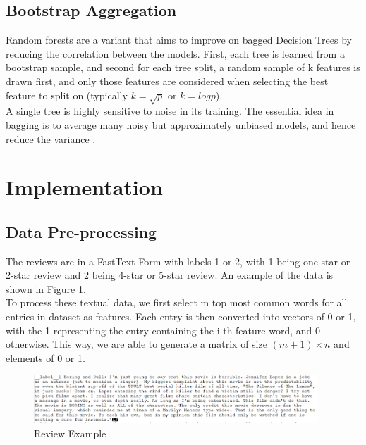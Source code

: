 \documentclass[11pt]{article}
\begin{document}
\subsection{Bootstrap Aggregation}
Random forests are a variant that aims to improve on bagged Decision Trees by reducing the correlation between the models. First, each tree is learned from a bootstrap sample, and second for each tree split, a random sample of k features is drawn first, and only those features are considered when selecting the best feature to split on (typically $k=\sqrt{p}$ or $k=log p$).\\

 A single tree is highly sensitive to noise in its training. The essential idea in bagging is to average many noisy but approximately unbiased models, and hence reduce the variance \cite{rf2}.\\

\section{Implementation}
\subsection{Data Pre-processing}
The reviews are in a FastText Form with labels 1 or 2, with 1 being one-star or 2-star review and 2 being 4-star or 5-star review. An example of the data is shown in Figure \ref{reviewExample}.\\

To process these textual data, we first select m top most common words for all entries in dataset as features. Each entry is then converted into vectors of 0 or 1, with the 1 representing the entry containing the i-th feature word, and 0 otherwise. This way, we are able to generate a matrix of size $(m+1) \times n$ and elements of 0 or 1.\\

\begin{minipage}{\textwidth}		
	\begin{figure}[H]
		\centering
		\includegraphics[width=0.95\textwidth]{reviewExample}
		\caption{Review Example}
		\label{reviewExample}
	\end{figure}
\end{minipage} \hfill
\end{document}
